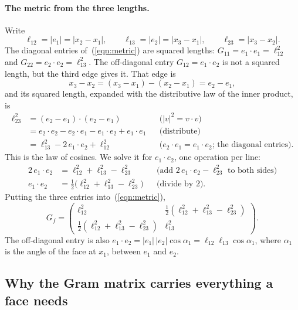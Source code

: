 \paragraph{The metric from the three lengths.} Write
\begin{equation*}
\ell_{12} = |e_1| = |x_2 - x_1|, \qquad \ell_{13} = |e_2| = |x_3 - x_1|, \qquad \ell_{23} = |x_3 - x_2| .
\end{equation*}
The diagonal entries of~(\ref{eqn:metric}) are squared lengths: $G_{11} = e_1\cdot e_1 = \ell_{12}^2$ and $G_{22} = e_2\cdot e_2 = \ell_{13}^2$. The off-diagonal entry $G_{12} = e_1\cdot e_2$ is not a squared length, but the third edge gives it. That edge is
\begin{equation*}
x_3 - x_2 = (x_3 - x_1) - (x_2 - x_1) = e_2 - e_1 ,
\end{equation*}
and its squared length, expanded with the distributive law of the inner product, is
\begin{align*}
\ell_{23}^2 &= (e_2 - e_1)\cdot(e_2 - e_1) && \text{($|v|^2 = v \cdot v$)} \\
&= e_2\cdot e_2 - e_2 \cdot e_1 - e_1\cdot e_2 + e_1 \cdot e_1 && \text{(distribute)} \\
&= \ell_{13}^2 - 2\, e_1\cdot e_2 + \ell_{12}^2 && \text{($e_2\cdot e_1 = e_1\cdot e_2$; the diagonal entries).}
\end{align*}
This is the law of cosines. We solve it for $e_1 \cdot e_2$, one operation per line:
\begin{align*}
2\, e_1\cdot e_2 &= \ell_{12}^2 + \ell_{13}^2 - \ell_{23}^2 && \text{(add $2\,e_1\cdot e_2 - \ell_{23}^2$ to both sides)} \\
e_1\cdot e_2 &= \tfrac12\big(\ell_{12}^2 + \ell_{13}^2 - \ell_{23}^2\big) && \text{(divide by $2$).}
\end{align*}
Putting the three entries into~(\ref{eqn:metric}),
\begin{equation}
\label{eqn:gram}
G_f = \begin{pmatrix} \ell_{12}^2 & \frac12 (\ell_{12}^2 + \ell_{13}^2 - \ell_{23}^2) \\ \frac12 (\ell_{12}^2 + \ell_{13}^2 - \ell_{23}^2) & \ell_{13}^2 \end{pmatrix}.
\end{equation}
The off-diagonal entry is also $e_1 \cdot e_2 = |e_1|\,|e_2| \cos\alpha_1 = \ell_{12} \ell_{13} \cos\alpha_1$, where $\alpha_1$ is the angle of the face at $x_1$, between $e_1$ and $e_2$.

\subsection{Why the Gram matrix carries everything a face needs}

